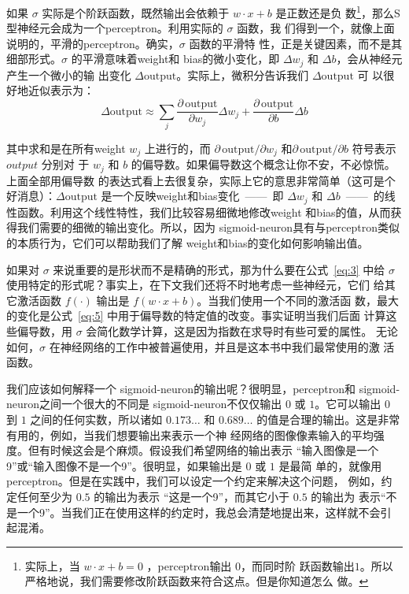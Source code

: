 如果 $\sigma$ 实际是个阶跃函数，既然输出会依赖于 $w\cdot x+b$ 是正数还是负
数\footnote{实际上，当 $w \cdot x +b = 0$ ，\gls*{perceptron}输出 $0$，而同时阶
  跃函数输出$1$。所以严格地说，我们需要修改阶跃函数来符合这点。但是你知道怎么
  做。}，那么S型神经元会成为一个\gls*{perceptron}。利用实际的 $\sigma$ 函数，我
们得到一个，就像上面说明的，平滑的\gls*{perceptron}。确实，$\sigma$ 函数的平滑特
性，正是关键因素，而不是其细部形式。$\sigma$ 的平滑意味着\gls*{weight}和%
\gls*{bias}的微小变化，即 $\Delta w_j$ 和 $\Delta b$，会从神经元产生一个微小的输
出变化 $\Delta \mbox{output}$。实际上，微积分告诉我们 $\Delta \mbox{output}$ 可
以很好地近似表示为：
\begin{equation}
  \Delta \mbox{output} \approx \sum_j \frac{\partial \, \mbox{output}}{\partial w_j}
  \Delta w_j + \frac{\partial \, \mbox{output}}{\partial b} \Delta b
  \label{eq:5}\tag{5}
\end{equation}

其中求和是在所有\gls*{weight} $w_j$ 上进行的，而 $\partial \, \mbox{output} /
\partial w_j$ 和$\partial \, \mbox{output} /\partial b$ 符号表示 $output$ 分别对
于 $w_j$ 和 $b$ 的偏导数。如果偏导数这个概念让你不安，不必惊慌。上面全部用偏导数
的表达式看上去很复杂，实际上它的意思非常简单（这可是个好消息）：$\Delta
\mbox{output}$ 是一个反映\gls*{weight}和\gls*{bias}变化~——~即 $\Delta w_j$ 和
$\Delta b$~——~的线性函数。利用这个线性特性，我们比较容易细微地修改\gls*{weight}
和\gls*{bias}的值，从而获得我们需要的细微的输出变化。所以，因为%
\gls*{sigmoid-neuron}具有与\gls*{perceptron}类似的本质行为，它们可以帮助我们了解%
\gls*{weight}和\gls*{bias}的变化如何影响输出值。

如果对 $\sigma$ 来说重要的是形状而不是精确的形式，那为什么要在公式~\eqref{eq:3}
中给 $\sigma$ 使用特定的形式呢？事实上，在下文我们还将不时地考虑一些神经元，它们
给其它激活函数 $f(\cdot)$ 输出是 $f(w \cdot x + b)$。当我们使用一个不同的激活函
数，最大的变化是公式~\eqref{eq:5} 中用于偏导数的特定值的改变。事实证明当我们后面
计算这些偏导数，用 $\sigma$ 会简化数学计算，这是因为指数在求导时有些可爱的属性。
无论如何，$\sigma$ 在神经网络的工作中被普遍使用，并且是这本书中我们最常使用的激
活函数。

我们应该如何解释一个 \gls*{sigmoid-neuron}的输出呢？很明显，\gls*{perceptron}和
\gls*{sigmoid-neuron}之间一个很大的不同是 \gls*{sigmoid-neuron}不仅仅输出 $0$ 或
$1$。它可以输出 $0$ 到 $1$ 之间的任何实数，所以诸如 $0.173\ldots$ 和
$0.689\ldots$ 的值是合理的输出。这是非常有用的，例如，当我们想要输出来表示一个神
经网络的图像像素输入的平均强度。但有时候这会是个麻烦。假设我们希望网络的输出表示
“输入图像是一个9”或“输入图像不是一个9”。很明显，如果输出是 $0$ 或 $1$ 是最简
单的，就像用\gls*{perceptron}。但是在实践中，我们可以设定一个约定来解决这个问题，
例如，约定任何至少为 $0.5$ 的输出为表示 “这是一个9”，而其它小于 $0.5$ 的输出为
表示“不是一个9”。当我们正在使用这样的约定时，我总会清楚地提出来，这样就不会引
起混淆。

